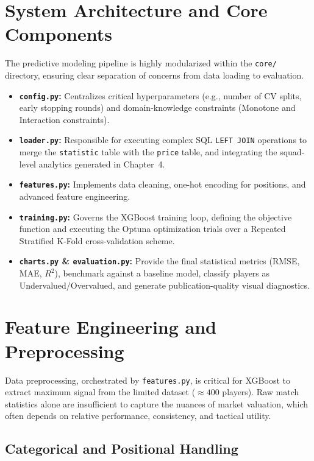 \documentclass[a4paper,12pt]{report}
\begin{document}
\section{System Architecture and Core Components}

The predictive modeling pipeline is highly modularized within the \texttt{core/} directory, ensuring clear separation of concerns from data loading to evaluation.

\begin{itemize}
    \item \textbf{\texttt{config.py}:} Centralizes critical hyperparameters (e.g., number of CV splits, early stopping rounds) and domain-knowledge constraints (Monotone and Interaction constraints).
    \item \textbf{\texttt{loader.py}:} Responsible for executing complex SQL \texttt{LEFT JOIN} operations to merge the \texttt{statistic} table with the \texttt{price} table, and integrating the squad-level analytics generated in Chapter~4.
    \item \textbf{\texttt{features.py}:} Implements data cleaning, one-hot encoding for positions, and advanced feature engineering.
    \item \textbf{\texttt{training.py}:} Governs the XGBoost training loop, defining the objective function and executing the Optuna optimization trials over a Repeated Stratified K-Fold cross-validation scheme.
    \item \textbf{\texttt{charts.py} \& \texttt{evaluation.py}:} Provide the final statistical metrics (RMSE, MAE, $R^2$), benchmark against a baseline model, classify players as Undervalued/Overvalued, and generate publication-quality visual diagnostics.
\end{itemize}

\section{Feature Engineering and Preprocessing}

Data preprocessing, orchestrated by \texttt{features.py}, is critical for XGBoost to extract maximum signal from the limited dataset ($\approx 400$ players). Raw match statistics alone are insufficient to capture the nuances of market valuation, which often depends on relative performance, consistency, and tactical utility.

\subsection{Categorical and Positional Handling}
\end{document}
